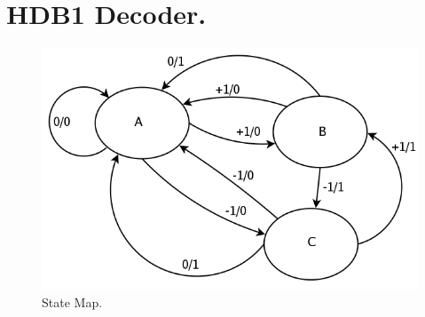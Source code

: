 \documentclass[11pt]{article}
\begin{document}
\vspace{10pt}
\section{HDB1 Decoder. }

\begin{figure}[H]
\centering
\includegraphics[scale=0.2665]{estados-hdb1_dec}
\caption[ ]{\label{estados-hdb1_dec} State Map. }
\end{figure}
\end{document}
